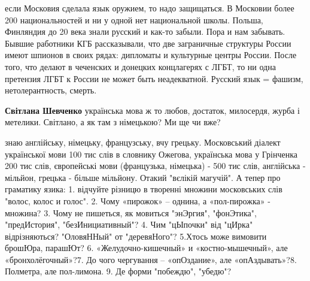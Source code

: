 \begin{itemize}
 

если Московия сделала язык оружием, то надо защищаться. В Московии более 200
национальностей и ни у одной нет национальной школы. Польша, Финляндия до 20
века знали русский и как-то забыли. Пора и нам забывать. Бывшие работники КГБ
рассказывали, что две заграничные структуры России имеют шпионов в своих рядах:
дипломаты и культурные центры России. После того, что делают в чеченских и
донецких концлагерях с ЛГБТ, то ни одна претензия ЛГБТ к России не может быть
неадекватной. Русский язык = фашизм, нетолерантность, смерть.

\begin{itemize}
 
\textbf{Світлана Шевченко} українська мова ж то любов, достаток, милосердя, журба і метелики. Світлано, а як там з німецькою? Ми ще чи вже?

 

знаю англійську, німецьку, французську, вчу грецьку. Московський діалект
української мови 100 тис слів в словнику Ожегова, українська мова у Грінченка
200 тис слів, європейські мови (французька, німецька) - 500 тис слів,
англійська - мільйон, грецька - більше мільйону. Отакий "вєлікій магучій". А
тепер про граматику язика: 1. відчуйте різницю в творенні множини московських
слів "волос, колос и голос". 2. Чому «пирожок» – однина, а «пол-пирожка» -
множина? 3. Чому не пишеться, як мовиться "энЭргия", "фонЭтика", "предИстория",
"безИнициативный"? 4. Чим "цЫпочки" від "цИрка" відрізняються? "ОловяННый" от
"деревяНого"? 5.Хтось може вимовити брошЮра, парашЮт? 6. «Желудочно-кишечный» и
«костно-мышечный», але «бронхолёгочный»?7. До чого чергування – «опОздание»,
але «опАздывать»?8. Полметра, але пол-лимона. 9. Де форми "побеждю", "убедю"?



\end{itemize}
\end{itemize}
